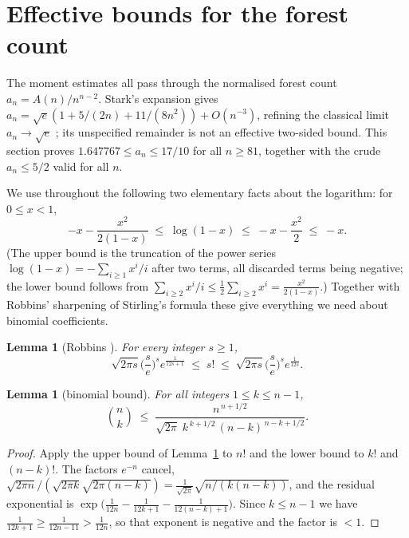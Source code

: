 \documentclass[11pt,a4paper]{amsart}
\theoremstyle{plain}
\newtheorem{lemma}[theorem]{Lemma}
\theoremstyle{definition}
\begin{document}
\section{Effective bounds for the forest count}\label{sec:forestcount}

The moment estimates all pass through the normalised forest count
$a_n = A(n)/n^{n-2}$. Stark's expansion \cite[Lemma~4.1]{Stark2011} gives
$a_n=\sqrt e(1+5/(2n)+11/(8n^2))+O(n^{-3})$, refining the classical limit
$a_n\to\sqrt e$ \cite{Renyi1959}; its unspecified remainder is not an effective
two-sided bound. This section proves
$1.647767 \le a_n \le 17/10$ for all $n \ge 81$, together with the crude
$a_n \le 5/2$ valid for all $n$.

We use throughout the following two elementary facts about the logarithm: for
$0 \le x < 1$,
\begin{equation}\label{eq:logs}
  -x-\frac{x^2}{2(1-x)} \;\le\; \log(1-x) \;\le\; -x-\frac{x^2}{2} \;\le\; -x .
\end{equation}
(The upper bound is the truncation of the power series
$\log(1-x) = -\sum_{i\ge1}x^i/i$ after two terms, all discarded terms being
negative; the lower bound follows from
$\sum_{i \ge 2} x^i/i \le \frac{1}{2}\sum_{i\ge2}x^i = \frac{x^2}{2(1-x)}$.)
Together with Robbins' sharpening of Stirling's formula these give everything we
need about binomial coefficients.

\begin{lemma}[Robbins \cite{Robbins1955}]\label{lem:robbins}
For every integer $s \ge 1$,
\[
  \sqrt{2\pi s}\Big(\frac{s}{e}\Big)^{s}e^{\frac{1}{12s+1}}
  \;\le\; s! \;\le\;
  \sqrt{2\pi s}\Big(\frac{s}{e}\Big)^{s}e^{\frac{1}{12s}} .
\]
\end{lemma}

\begin{lemma}[binomial bound]\label{lem:binom}
For all integers $1 \le k \le n-1$,
\[
  \binom{n}{k} \;\le\;
  \frac{n^{\,n+1/2}}{\sqrt{2\pi}\; k^{\,k+1/2}\,(n-k)^{\,n-k+1/2}} .
\]
\end{lemma}

\begin{proof}
Apply the upper bound of Lemma~\ref{lem:robbins} to $n!$ and the lower bound to
$k!$ and $(n-k)!$. The factors $e^{-n}$ cancel, $\sqrt{2\pi n}/(\sqrt{2\pi k}
\sqrt{2\pi(n-k)}) = \frac{1}{\sqrt{2\pi}}\sqrt{n/(k(n-k))}$, and the residual
exponential is $\exp\!\big(\frac{1}{12n}-\frac{1}{12k+1}-\frac{1}{12(n-k)+1}\big)$.
Since $k \le n-1$ we have $\frac{1}{12k+1}\ge\frac{1}{12n-11}>\frac{1}{12n}$, so
that exponent is negative and the factor is $<1$.
\end{proof}
\end{document}
